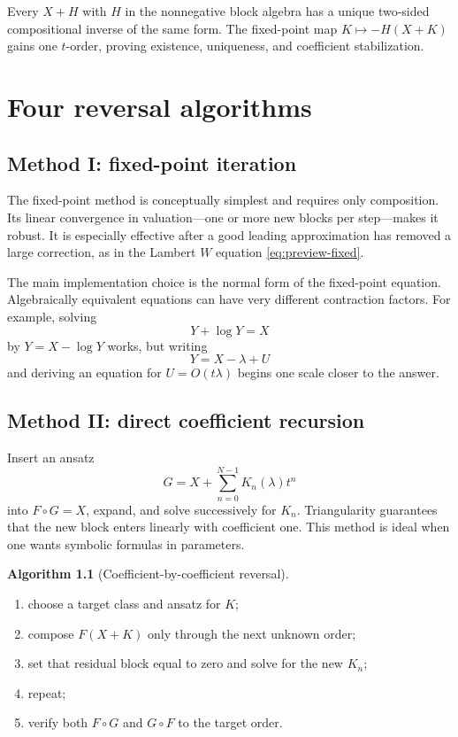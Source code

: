 \documentclass[11pt,openany]{book}
\theoremstyle{definition}
\newtheorem{algorithm}{Algorithm}[chapter]
\theoremstyle{plain}
\theoremstyle{remark}
\begin{document}
\begin{summarybox}
Every \(X+H\) with \(H\) in the nonnegative block algebra has a unique two-sided compositional inverse of the same form. The fixed-point map \(K\mapsto-H(X+K)\) gains one \(t\)-order, proving existence, uniqueness, and coefficient stabilization.
\end{summarybox}

\chapter{Four reversal algorithms}\label{ch:reversal-algorithms}

\section{Method I: fixed-point iteration}
The fixed-point method is conceptually simplest and requires only composition. Its linear convergence in valuation---one or more new blocks per step---makes it robust. It is especially effective after a good leading approximation has removed a large correction, as in the Lambert \(W\) equation \cref{eq:preview-fixed}.

The main implementation choice is the normal form of the fixed-point equation. Algebraically equivalent equations can have very different contraction factors. For example, solving
\[
 Y+\log Y=X
\]
by \(Y=X-\log Y\) works, but writing
\[
 Y=X-\lambda+U
\]
and deriving an equation for \(U=O(t\lambda)\) begins one scale closer to the answer.

\section{Method II: direct coefficient recursion}
Insert an ansatz
\[
 G=X+\sum_{n=0}^{N-1}K_n(\lambda)t^n
\]
into \(F\circ G=X\), expand, and solve successively for \(K_n\). Triangularity guarantees that the new block enters linearly with coefficient one. This method is ideal when one wants symbolic formulas in parameters.

\begin{algorithm}[Coefficient-by-coefficient reversal]\label{alg:coefficient-reversal}
\begin{enumerate}
\item choose a target class and ansatz for \(K\);
\item compose \(F(X+K)\) only through the next unknown order;
\item set that residual block equal to zero and solve for the new \(K_n\);
\item repeat;
\item verify both \(F\circ G\) and \(G\circ F\) to the target order.
\end{enumerate}
\end{algorithm}
\end{document}
